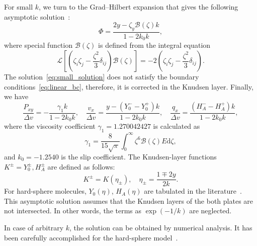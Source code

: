 \documentclass[aip,pof,preprint]{revtex4-1}
\newcommand{\dd}{\mathrm{d}}
\begin{document}
For small \(k\), we turn to the Grad--Hilbert expansion
that gives the following asymptotic solution~\cite{Ohwada1990, Sone2007}:
\begin{equation}\label{eq:small_solution}
    \Phi = \frac{2y - \zeta_y \mathcal{B}(\zeta) k}{1-2k_0k},
\end{equation}
where special function \(\mathcal{B}(\zeta)\) is defined from the integral equation
\begin{equation}\label{eq:transport_B}
    \mathcal{L}\left[\left(\zeta_i\zeta_j-\frac{\zeta^2}3\delta_{ij}\right) \mathcal{B}(\zeta)\right]
        = -2\left(\zeta_i\zeta_j-\frac{\zeta^2}3\delta_{ij}\right).
\end{equation}
The solution~\eqref{eq:small_solution} does not satisfy the boundary conditions~\eqref{eq:linear_bc},
therefore, it is corrected in the Knudsen layer. Finally, we have
\begin{equation}\label{eq:small_macro}
    \frac{P_{xy}}{\Delta{v}} = - \frac{\gamma_1 k}{1-2k_0k}, \quad
    \frac{v_x}{\Delta{v}} = \frac{y - (Y_0^--Y_0^+)k}{1-2k_0k}, \quad
    \frac{q_x}{\Delta{v}} = \frac{(H_A^--H_A^+)k}{1-2k_0k},
\end{equation}
where the viscosity coefficient \(\gamma_1 = 1.270042427\) is calculated as
\begin{equation}\label{eq:gamma_1}
    \gamma_1 = \frac{8}{15\sqrt\pi}\int_0^\infty \zeta^6 \mathcal{B}(\zeta)E\dd\zeta,
\end{equation}
and \(k_0 = -1.2540\) is the slip coefficient.
The Knudsen-layer functions \(K^\pm = Y_0^\pm, H_A^\pm\) are defined as follows:
\begin{equation}\label{eq:linear_knudsen_functions}
     K^\pm = K(\eta_\pm), \quad \eta_\pm = \frac{1 \mp 2y}{2k}.
\end{equation}
For hard-sphere molecules, \(Y_0(\eta)\), \(H_A(\eta)\)
are tabulated in the literature~\cite{Ohwada1989a, Sone2002, Sone2007}.
This asymptotic solution assumes that the Knudsen layers of the both plates are not intersected.
In other words, the terms as \(\exp(-1/k)\) are neglected.

In case of arbitrary \(k\), the solution can be obtained by numerical analysis.
It has been carefully accomplished for the hard-sphere model~\cite{Ohwada1990}.
\end{document}
